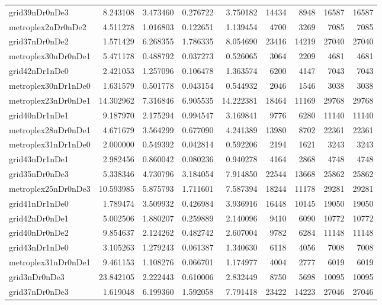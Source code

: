 \begin{longtable}{|l|r|r|r|r|r|r|r|r|}
grid39nDr0nDe3 & 8.243108 & 3.473460 & 0.276722 & 3.750182 & 14434 & 8948 & 16587 & 16587 \\
metroplex2nDr0nDe2 & 4.511278 & 1.016803 & 0.122651 & 1.139454 & 4700 & 3269 & 7085 & 7085 \\
grid37nDr0nDe2 & 1.571429 & 6.268355 & 1.786335 & 8.054690 & 23416 & 14219 & 27040 & 27040 \\
metroplex30nDr0nDe1 & 5.471178 & 0.488792 & 0.037273 & 0.526065 & 3064 & 2209 & 4681 & 4681 \\
grid42nDr1nDe0 & 2.421053 & 1.257096 & 0.106478 & 1.363574 & 6200 & 4147 & 7043 & 7043 \\
metroplex30nDr1nDe0 & 1.631579 & 0.501778 & 0.043154 & 0.544932 & 2046 & 1546 & 3038 & 3038 \\
metroplex23nDr0nDe1 & 14.302962 & 7.316846 & 6.905535 & 14.222381 & 18464 & 11169 & 29768 & 29768 \\
grid40nDr1nDe1 & 9.187970 & 2.175294 & 0.994547 & 3.169841 & 9776 & 6280 & 11140 & 11140 \\
metroplex28nDr0nDe1 & 4.671679 & 3.564299 & 0.677090 & 4.241389 & 13980 & 8702 & 22361 & 22361 \\
metroplex31nDr1nDe0 & 2.000000 & 0.549392 & 0.042814 & 0.592206 & 2194 & 1621 & 3243 & 3243 \\
grid43nDr1nDe1 & 2.982456 & 0.860042 & 0.080236 & 0.940278 & 4164 & 2868 & 4748 & 4748 \\
grid35nDr0nDe3 & 5.338346 & 4.730796 & 3.184054 & 7.914850 & 22544 & 13668 & 25862 & 25862 \\
metroplex25nDr0nDe3 & 10.593985 & 5.875793 & 1.711601 & 7.587394 & 18244 & 11178 & 29281 & 29281 \\
grid41nDr1nDe0 & 1.789474 & 3.509932 & 0.426984 & 3.936916 & 16448 & 10145 & 19050 & 19050 \\
grid42nDr0nDe1 & 5.002506 & 1.880207 & 0.259889 & 2.140096 & 9410 & 6090 & 10772 & 10772 \\
grid40nDr0nDe2 & 9.854637 & 2.124262 & 0.482742 & 2.607004 & 9782 & 6284 & 11148 & 11148 \\
grid43nDr1nDe0 & 3.105263 & 1.279243 & 0.061387 & 1.340630 & 6118 & 4056 & 7008 & 7008 \\
metroplex31nDr0nDe1 & 9.461153 & 1.108276 & 0.066701 & 1.174977 & 4004 & 2777 & 6019 & 6019 \\
grid3nDr0nDe3 & 23.842105 & 2.222443 & 0.610006 & 2.832449 & 8750 & 5698 & 10095 & 10095 \\
grid37nDr0nDe3 & 1.619048 & 6.199360 & 1.592058 & 7.791418 & 23422 & 14223 & 27046 & 27046 \\

\end{longtable}
